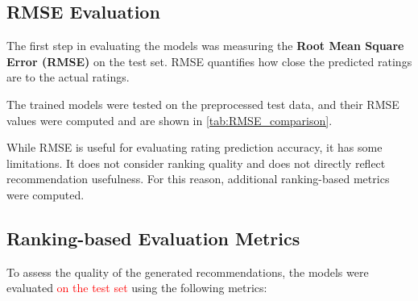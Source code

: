 \documentclass[11pt,a4paper]{article}
\begin{document}
\subsection{RMSE Evaluation}

The first step in evaluating the models was measuring the \textbf{Root Mean Square Error (RMSE)} on the test set. RMSE quantifies how close the predicted ratings are to the actual ratings.

The trained models were tested on the preprocessed test data, and their RMSE values were computed and are shown in \autoref{tab:RMSE_comparison}.

\begin{table}[H]
    \centering
    \caption{RMSE Comparison on Test Set}
    \label{tab:RMSE_comparison}
\end{table}

While RMSE is useful for evaluating rating prediction accuracy, it has some limitations. It does not consider ranking quality and does not directly reflect recommendation usefulness. For this reason, additional ranking-based metrics were computed.

\subsection{Ranking-based Evaluation Metrics}

To assess the quality of the generated recommendations, the models were evaluated \textcolor{red}{on the test set} using the following metrics:
\end{document}
